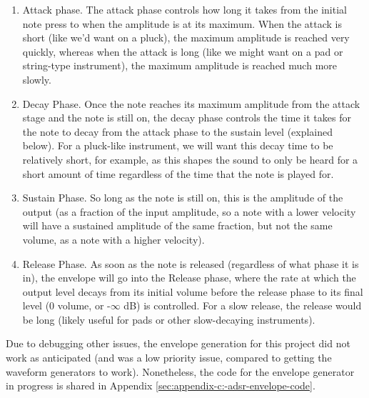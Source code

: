 \begin{enumerate}
    \item Attack phase. The attack phase controls how long it takes from the initial note press to when the amplitude is at its maximum. When the attack is short (like we'd want on a pluck), the maximum amplitude is reached very quickly, whereas when the attack is long (like we might want on a pad or string-type instrument), the maximum amplitude is reached much more slowly. 
    \item Decay Phase. Once the note reaches its maximum amplitude from the attack stage and the note is still on, the decay phase controls the time it takes for the note to decay from the attack phase to the sustain level (explained below). For a pluck-like instrument, we will want this decay time to be relatively short, for example, as this shapes the sound to only be heard for a short amount of time regardless of the time that the note is played for. 
    \item Sustain Phase. So long as the note is still on, this is the amplitude of the output (as a fraction of the input amplitude, so a note with a lower velocity will have a sustained amplitude of the same fraction, but not the same volume, as a note with a higher velocity). 
    \item Release Phase. As soon as the note is released (regardless of what phase it is in), the envelope will go into the Release phase, where the rate at which the output level decays from its initial volume before the release phase to its final level (0 volume, or -$\infty$ dB) is controlled. For a slow release, the release would be long (likely useful for pads or other slow-decaying instruments). 
\end{enumerate}

Due to debugging other issues, the envelope generation for this project did not work as anticipated (and was a low priority issue, compared to getting the waveform generators to work). Nonetheless, the code for the envelope generator in progress is shared in Appendix \ref{sec:appendix-c:-adsr-envelope-code}. 